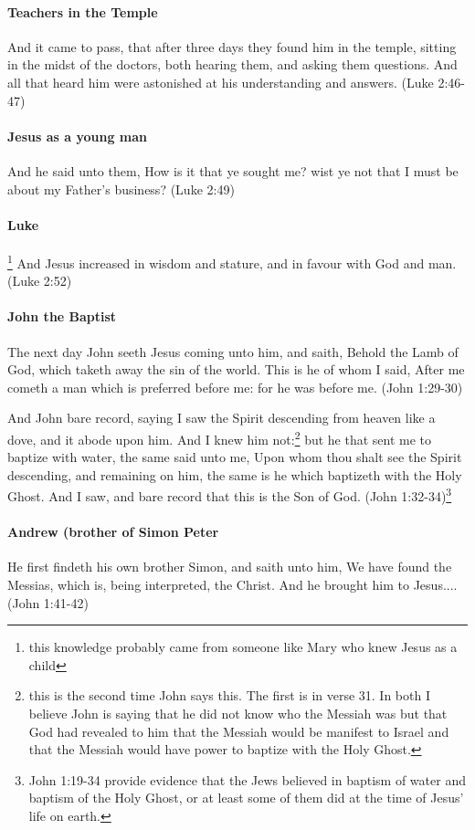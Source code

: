 \paragraph{Teachers in the Temple}
And it came to pass, that after three days they found him in the temple, sitting in the midst of the doctors, both hearing them, and asking them questions. And all that heard him were astonished at his understanding and answers. (Luke 2:46-47)

\paragraph{Jesus as a young man}
And he said unto them, How is it that ye sought me? wist ye not that I must be about my Father's business? (Luke 2:49)

\paragraph{Luke}\footnote{this knowledge probably came from someone like Mary who knew Jesus as a child}
And Jesus increased in wisdom and stature, and in favour with God and man. (Luke 2:52)

\paragraph{John the Baptist}
The next day John seeth Jesus coming unto him, and saith, Behold the Lamb of God, which taketh away the sin of the world. This is he of whom I said, After me cometh a man which is preferred before me: for he was before me. (John 1:29-30)

And John bare record, saying I saw the Spirit descending from heaven like a dove, and it abode upon him. And I knew him not:\footnote{this is the second time John says this. The first is in verse 31. In both I believe John is saying that he did not know who the Messiah was but that God had revealed to him that the Messiah would be manifest to Israel and that the Messiah would have power to baptize with the Holy Ghost.} but he that sent me to baptize with water, the same said unto me, Upon whom thou shalt see the Spirit descending, and remaining on him, the same is he which baptizeth with the Holy Ghost. And I saw, and bare record that this is the Son of God. (John 1:32-34)\footnote{John 1:19-34 provide evidence that the Jews believed in baptism of water and baptism of the Holy Ghost, or at least some of them did at the time of Jesus' life on earth.}

\paragraph{Andrew (brother of Simon Peter}
He first findeth his own brother Simon, and saith unto him, We have found the Messias, which is, being interpreted, the Christ. And he brought him to Jesus.... (John 1:41-42)

